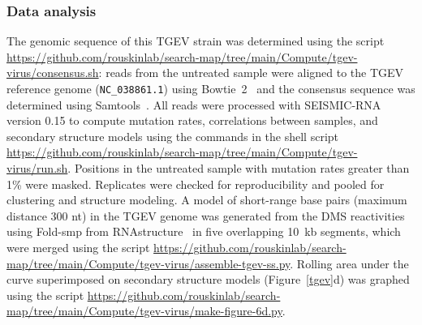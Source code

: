 \documentclass[main.tex]{subfiles}
\begin{document}
\subsubsection{Data analysis}

The genomic sequence of this TGEV strain was determined using the script \url{https://github.com/rouskinlab/search-map/tree/main/Compute/tgev-virus/consensus.sh}: reads from the untreated sample were aligned to the TGEV reference genome (\verb|NC_038861.1|) using Bowtie~2~\cite{Langmead2012} and the consensus sequence was determined using Samtools~\cite{Li2009}.
All reads were processed with SEISMIC-RNA version 0.15 to compute mutation rates, correlations between samples, and secondary structure models using the commands in the shell script \url{https://github.com/rouskinlab/search-map/tree/main/Compute/tgev-virus/run.sh}.
Positions in the untreated sample with mutation rates greater than 1\% were masked.
Replicates were checked for reproducibility and pooled for clustering and structure modeling.
A model of short-range base pairs (maximum distance 300 nt) in the TGEV genome was generated from the DMS reactivities using Fold-smp from RNAstructure~\cite{Reuter2010} in five overlapping 10~kb segments, which were merged using the script \url{https://github.com/rouskinlab/search-map/tree/main/Compute/tgev-virus/assemble-tgev-ss.py}.
Rolling area under the curve superimposed on secondary structure models (Figure~\ref{tgev}d) was graphed using the script \url{https://github.com/rouskinlab/search-map/tree/main/Compute/tgev-virus/make-figure-6d.py}.
\end{document}
